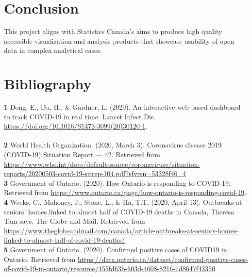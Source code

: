 \documentclass{article}
\begin{document}
\section{Conclusion}
This project aligns with Statistics Canada’s aims to produce high quality accessible visualization and analysis products that showcase usability of open data in complex analytical cases.





\section{Bibliography}

\textbf{1} Dong, E., Du, H., \& Gardner, L. (2020). An interactive web-based dashboard to track COVID-19 in real time. Lancet Infect Dis. \href{ https://doi.org/10.1016/S1473-3099(20)30120-1}{ https://doi.org/10.1016/S1473-3099(20)30120-1}.\\

\\
\textbf{2} World Health Organization. (2020, March 3). Coronavirus disease 2019 (COVID-19) Situation Report --- 42. Retrieved from \href{https://www.who.int/docs/default-source/coronaviruse/situation-reports/20200503-covid-19-sitrep-104.pdf?sfvrsn=53328f46_4}{https://www.who.int/docs/default-source/coronaviruse/situation-reports/20200503-covid-19-sitrep-104.pdf?sfvrsn=53328f46\_4}\\

\textbf{3} Government of Ontario. (2020). How Ontario is responding to COVID-19. Retrieved from \href{https://www.ontario.ca/page/how-ontario-is-responding-covid-19}{https://www.ontario.ca/page/how-ontario-is-responding-covid-19}.\\

\textbf{4} Weeks, C., Mahoney, J., Stone, L., \& Ha, T.T. (2020, April 13). Outbreaks at seniors’ homes linked to almost half of COVID-19 deaths in Canada, Theresa Tam says. The Globe and Mail. Retrieved from \href{https://www.theglobeandmail.com/canada/article-outbreaks-at-seniors-homes-linked-to-almost-half-of-covid-19-deaths/}{https://www.theglobeandmail.com/canada/article-outbreaks-at-seniors-homes-linked-to-almost-half-of-covid-19-deaths/} \\

\textbf{5} Government of Ontario. (2020). Confirmed positive cases of COVID19 in Ontario. Retrieved from \href{https://data.ontario.ca/dataset/confirmed-positive-cases-of-covid-19-in-ontario/resource/455fd63b-603d-4608-8216-7d8647f43350}{https://data.ontario.ca/dataset/confirmed-positive-cases-of-covid-19-in-ontario/resource/455fd63b-603d-4608-8216-7d8647f43350}.\\
\end{document}
